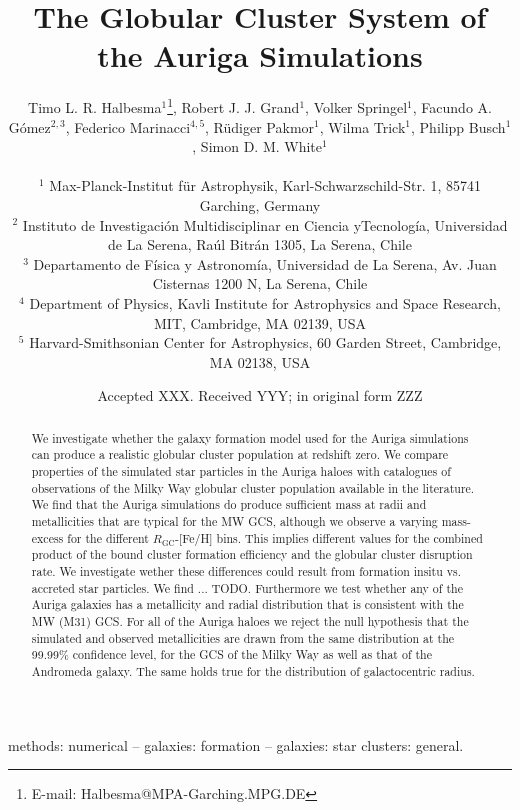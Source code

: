 \documentclass[a4paper,fleqn,usenatbib]{mnras}
\title[Auriga GCS]{The Globular Cluster System of the Auriga Simulations}
\author[T. L. R. Halbesma et al.]{\parbox[t]{\textwidth}{
    Timo L. R. Halbesma$^{1}$\thanks{E-mail: Halbesma@MPA-Garching.MPG.DE},
    Robert J. J. Grand$^{1}$,
    Volker Springel$^{1}$,
    Facundo A. G\'{o}mez$^{2,3}$,
    Federico Marinacci$^{4,5}$,
    R\"{u}diger Pakmor$^{1}$,
    Wilma Trick$^{1}$,
    Philipp Busch$^{1}$,
    Simon D. M. White$^{1}$
} \vspace{10pt} \\
$^{1}$ Max-Planck-Institut f\"ur Astrophysik, Karl-Schwarzschild-Str. 1,
    85741 Garching, Germany \\
$^{2}$ Instituto de Investigaci\'{o}n Multidisciplinar en Ciencia yTecnolog\'{i}a,
    Universidad de La Serena, Ra\'{u}l Bitr\'{a}n 1305, La Serena, Chile \\
$^{3}$ Departamento de F\'{i}sica y Astronom\'{i}a, Universidad de La Serena, Av.
    Juan Cisternas 1200 N, La Serena, Chile \\
$^{4}$ Department of Physics, Kavli Institute for Astrophysics and Space Research,
    MIT, Cambridge, MA 02139, USA \\
$^{5}$ Harvard-Smithsonian Center for Astrophysics, 60 Garden Street, Cambridge,
    MA 02138, USA \\
}
\date{Accepted XXX. Received YYY; in original form ZZZ}
\begin{document}
\label{firstpage}
\pagerange{\pageref{firstpage}--\pageref{lastpage}}
\maketitle

\begin{abstract}
We investigate whether the galaxy formation model used for the Auriga simulations
can produce a realistic globular cluster population at redshift zero. We compare
properties of the simulated star particles in the Auriga haloes with
catalogues of observations of the Milky Way globular cluster population available
in the literature. We find that the Auriga simulations do produce sufficient mass
at radii and metallicities that are typical for the MW GCS, although we observe
a varying mass-excess for the different $R_{\text{GC}}$-[Fe/H] bins. This implies
different values for the combined product of the bound cluster formation efficiency
and the globular cluster disruption rate. We investigate wether these differences
could result from formation insitu vs. accreted star particles. We find ... TODO.
Furthermore we test whether any of the Auriga galaxies has a metallicity and radial
distribution that is consistent with the MW (M31) GCS. For all of the Auriga haloes
we reject the null hypothesis that the simulated and observed metallicities are
drawn from the same distribution at the 99.99\% confidence level, for the GCS
of the Milky Way as well as that of the Andromeda galaxy. The same holds true for
the distribution of galactocentric radius.
\end{abstract}

\begin{keywords}
methods: numerical -- galaxies: formation -- galaxies: star clusters: general.
\end{keywords}


\end{document}
